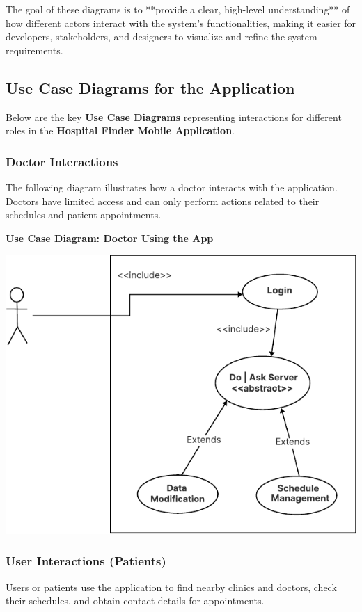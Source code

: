 \documentclass[12pt]{report}
\begin{document}
\noindent The goal of these diagrams is to **provide a clear, high-level understanding** of how different actors interact with the system’s functionalities, making it easier for developers, stakeholders, and designers to visualize and refine the system requirements.

\subsection{\textbf{Use Case Diagrams for the Application}}

\noindent Below are the key \textbf{Use Case Diagrams} representing interactions for different roles in the \textbf{Hospital Finder Mobile Application}.

\subsubsection{\textbf{Doctor Interactions}}
The following diagram illustrates how a doctor interacts with the application. Doctors have limited access and can only perform actions related to their schedules and patient appointments.

\vspace{0.5cm}
\noindent \textbf{Use Case Diagram: Doctor Using the App}
\begin{center}
	\includegraphics[width=\textwidth]{images/doctorCAS.pdf} %
\end{center}

\subsubsection{\textbf{User Interactions (Patients)}}
Users or patients use the application to find nearby clinics and doctors, check their schedules, and obtain contact details for appointments.
\end{document}
